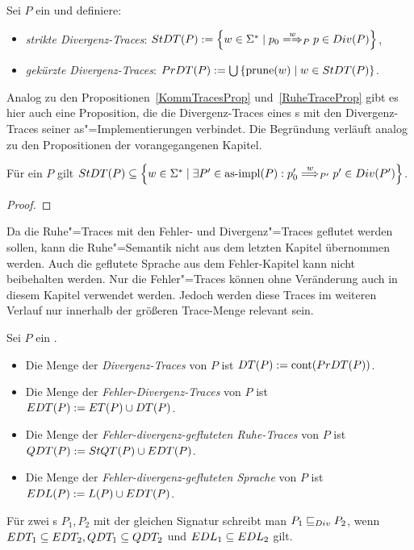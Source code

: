 \begin{Def}
  Sei $P$ ein \MEIO{} und definiere:
  \begin{itemize}
    \item \emph{strikte Divergenz-Traces}: $\StDT (P) := \left\{w\in\Sigma
      ^*\mid p_0\weakmay[w]_P p\in Div(P)\right\}$,
    \item \emph{gekürzte Divergenz-Traces}: $PrDT (P) := \bigcup\left\{\mathrm{prune}
      (w)\mid w\in StDT (P)\right\}$.
  \end{itemize}
\end{Def}

Analog zu den Propositionen~\ref{KommTracesProp} und~\ref{RuheTraceProp} gibt es
hier auch eine Proposition, die die Divergenz-Traces eines \MEIO{}s mit den
Divergenz-Traces seiner as"=Implementierungen verbindet. Die Begründung
verläuft analog zu den Propositionen der vorangegangenen Kapitel.

\begin{Prop}
  Für ein \MEIO{} $P$ gilt $\StDT (P) \subseteq \left\{w\in\Sigma ^*\mid
  \exists P' \in \asimp (P): p'_0\weakmust[w]_{P'} p'\in Div(P')\right\}$.
\end{Prop}
\begin{proof}
\end{proof}

Da die Ruhe"=Traces mit den Fehler- und Divergenz"=Traces geflutet werden
sollen, kann die Ruhe"=Semantik nicht aus dem letzten Kapitel übernommen
werden. Auch die geflutete Sprache aus dem Fehler-Kapitel kann nicht
beibehalten werden. Nur die Fehler"=Traces \ET{} können ohne Veränderung auch
in diesem Kapitel verwendet werden. Jedoch werden diese Traces im weiteren
Verlauf nur innerhalb der größeren Trace-Menge \EDT{} relevant sein.

\begin{Def}
  \label{DivSemDef}
  Sei $P$ ein \MEIO{}.
  \begin{itemize}
    \item Die Menge der \emph{Divergenz-Traces} von $P$ ist $DT (P) := \mathrm{cont}
      (PrDT (P))$.
    \item Die Menge der \emph{Fehler-Divergenz-Traces} von $P$ ist $EDT (P) :=
      ET (P)\cup DT (P)$.
    \item Die Menge der \emph{Fehler-divergenz-gefluteten
      Ruhe-Traces} von $P$ ist $QDT (P) := StQT (P)\cup EDT (P)$.
    \item Die Menge der \emph{Fehler-divergenz-gefluteten
      Sprache} von $P$ ist $EDL (P) := L(P)\cup EDT (P)$.
  \end{itemize}
  Für zwei \MEIO{}s $P_1,P_2$ mit der gleichen Signatur schreibt man $P_1 \sqsubseteq  _{Div}
  P_2$, wenn $EDT _1\subseteq EDT _2, QDT _1\subseteq QDT _2$ und $EDL
  _1\subseteq EDL _2$ gilt.
\end{Def}

